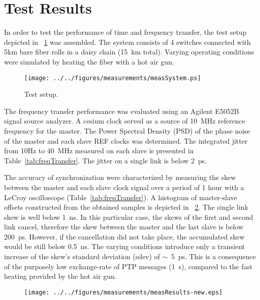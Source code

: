 \section{Test Results}

In order to test the performance of time and frequency transfer, the 
test setup depicted in \figurename~\ref{fig:testSetup} was assembled.
The system consists of 4 switches connected with 5km bare fiber rolls in 
a daisy chain (15~km total). Varying operating conditions were simulated
by heating the fiber with a hot air gun. 


\begin{figure}[!t]
\centering
\texttt{[image: ../../figures/measurements/measSystem.ps]}
\caption{Test setup.}
\label{fig:testSetup}
\end{figure}


The frequency transfer performance was evaluated using an Agilent E5052B signal source analyzer. 
A cesium clock served as a source of 10~MHz reference frequency for the master.
The Power Spectral Density (PSD) of the phase noise of the master and each slave 
REF clocks was determined. The integrated jitter from 10Hz to 40~MHz measured on each 
slave is presented in Table~\ref{tab:freqTransfer}. The jitter on a single link is below 2~ps. 

The accuracy  of synchronization %
were characterized by measuring the skew between 
the master and each slave clock signal over a period of 1 hour with a LeCroy oscilloscope
(Table~\ref{tab:freqTransfer}). A histogram of master-slave offsets constructed from the obtained
samples is depicted in \figurename~\ref{fig:offset}. The single link skew is
well below 1~ns. In this particular case, the skews of the first and second link cancel,
therefore the skew between the master and the last slave is below 200~ps. However, if the
cancellation did not take place, the accumulated skew would be still below 0.5~ns. The varying
conditions introduce only a transient increase of the skew's standard deviation (sdev) of 
$\sim$~5~ps. This is a consequence of the purposely %
low exchange-rate of PTP messages (1~s), compared
to the fast heating provided by the hot air gun.
\begin{figure}[!t]
\centering
\texttt{[image: ../../figures/measurements/measResults-new.eps]}
\caption{}
\label{fig:offset}
\end{figure}

